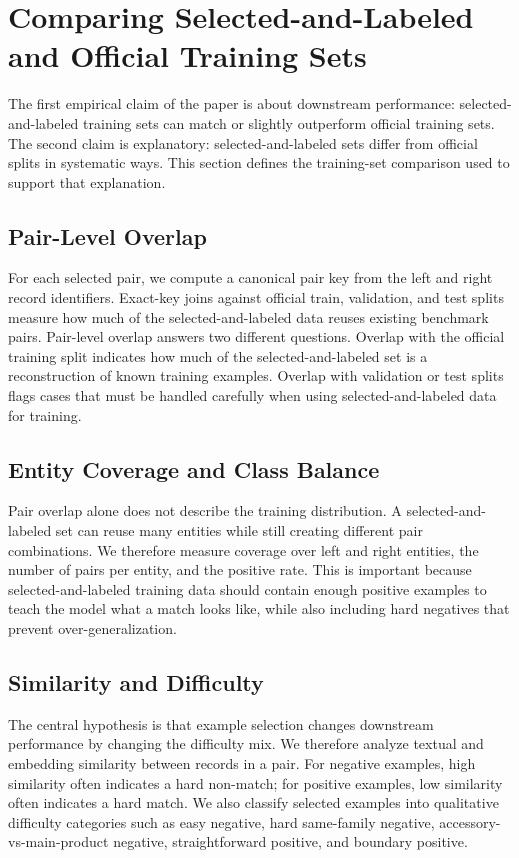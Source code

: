 \section{Comparing Selected-and-Labeled and Official Training Sets}

The first empirical claim of the paper is about downstream performance: selected-and-labeled training sets can match or slightly outperform official training sets. The second claim is explanatory: selected-and-labeled sets differ from official splits in systematic ways. This section defines the training-set comparison used to support that explanation.

\subsection{Pair-Level Overlap}

For each selected pair, we compute a canonical pair key from the left and right record identifiers. Exact-key joins against official train, validation, and test splits measure how much of the selected-and-labeled data reuses existing benchmark pairs. Pair-level overlap answers two different questions. Overlap with the official training split indicates how much of the selected-and-labeled set is a reconstruction of known training examples. Overlap with validation or test splits flags cases that must be handled carefully when using selected-and-labeled data for training.

\subsection{Entity Coverage and Class Balance}

Pair overlap alone does not describe the training distribution. A selected-and-labeled set can reuse many entities while still creating different pair combinations. We therefore measure coverage over left and right entities, the number of pairs per entity, and the positive rate. This is important because selected-and-labeled training data should contain enough positive examples to teach the model what a match looks like, while also including hard negatives that prevent over-generalization.

\subsection{Similarity and Difficulty}

The central hypothesis is that example selection changes downstream performance by changing the difficulty mix. We therefore analyze textual and embedding similarity between records in a pair. For negative examples, high similarity often indicates a hard non-match; for positive examples, low similarity often indicates a hard match. We also classify selected examples into qualitative difficulty categories such as easy negative, hard same-family negative, accessory-vs-main-product negative, straightforward positive, and boundary positive.

